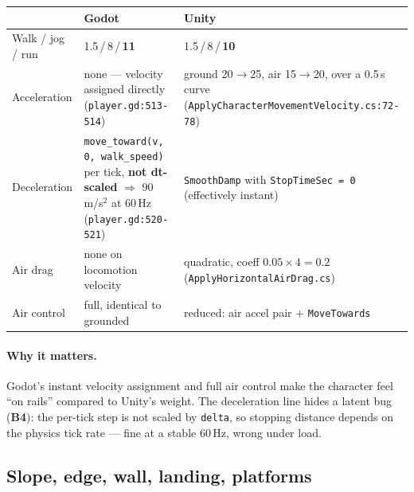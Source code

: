 \documentclass[11pt]{article}
\newcommand{\code}[1]{\texttt{\small #1}}
\newcommand{\godot}{\textbf{Godot}}
\newcommand{\unity}{\textbf{Unity}}
\begin{document}
\begin{center}\footnotesize
\begin{tabular}{@{}L{2.9cm} L{4.6cm} L{5.6cm}@{}}
\toprule
 & \godot & \unity \\
\midrule
Walk / jog / run & 1.5\,/\,8\,/\,\textbf{11} & 1.5\,/\,8\,/\,\textbf{10} \\
Acceleration & none --- velocity assigned directly (\code{player.gd:513-514}) &
  ground 20$\to$25, air 15$\to$20, over a 0.5\,s curve (\code{ApplyCharacterMovement}\allowbreak\code{Velocity.cs:72-78}) \\
Deceleration & \code{move\_toward(v, 0, walk\_speed)} per tick, \textbf{not dt-scaled}
  $\Rightarrow$ 90\,m/s$^2$ at 60\,Hz (\code{player.gd:520-521}) &
  \code{SmoothDamp} with \code{StopTimeSec\,=\,0} (effectively instant) \\
Air drag & none on locomotion velocity &
  quadratic, coeff $0.05 \times 4 = 0.2$ (\code{ApplyHorizontalAirDrag.cs}) \\
Air control & full, identical to grounded & reduced: air accel pair + \code{MoveTowards} \\
\bottomrule
\end{tabular}
\end{center}

\paragraph{Why it matters.} Godot's instant velocity assignment and full air control make
the character feel ``on rails'' compared to Unity's weight. The deceleration line hides a
latent bug (\textbf{B4}): the per-tick step is not scaled by \code{delta}, so stopping
distance depends on the physics tick rate --- fine at a stable 60\,Hz, wrong under load.

\subsection{Slope, edge, wall, landing, platforms}
\end{document}
